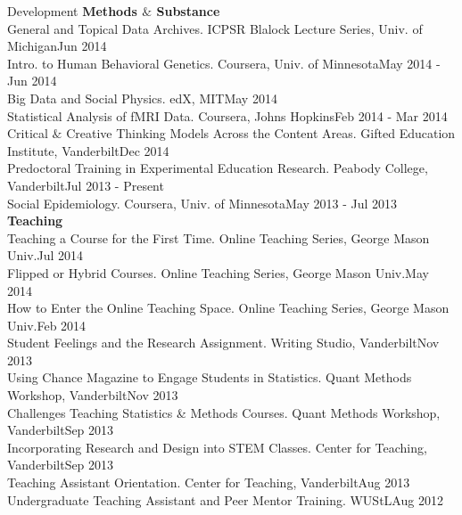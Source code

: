 \documentclass {resume}
\begin{document}
\pagebreak

\begin{rSection}{\textrm{Development}}
{\large \textbf{Methods $\&$ Substance}}\\
General and Topical Data Archives. ICPSR Blalock Lecture Series, Univ. of Michigan\hfill  {Jun 2014}\smallskip\\
Intro. to Human Behavioral Genetics. Coursera, Univ. of Minnesota\hfill  {May 2014 - Jun 2014}\smallskip\\
Big Data and Social Physics. edX, MIT\hfill  {May 2014}\smallskip\\
Statistical Analysis of fMRI Data. Coursera, Johns Hopkins\hfill  {Feb 2014 - Mar 2014}\smallskip\\
Critical $\&$ Creative Thinking Models Across the Content Areas. Gifted Education Institute, Vanderbilt\hfill {Dec 2014}\smallskip\\
Predoctoral Training in Experimental Education Research. Peabody College, Vanderbilt\hfill  {Jul 2013 - Present}\smallskip\\
Social Epidemiology. Coursera, Univ. of Minnesota\hfill  {May 2013 - Jul 2013}%
\medskip\\
{\large {\bf Teaching}}\\
Teaching a Course for the First Time. Online Teaching Series, George Mason Univ.\hfill  {Jul 2014}\smallskip\\
Flipped or Hybrid Courses. Online Teaching Series, George Mason Univ.\hfill  {May 2014}\smallskip\\
How to Enter the Online Teaching Space. Online Teaching Series, George Mason Univ.\hfill  {Feb 2014}\smallskip\\
Student Feelings and the Research Assignment. Writing Studio, Vanderbilt\hfill  {Nov 2013}\smallskip\\
Using Chance Magazine to Engage Students in Statistics. Quant Methods Workshop, Vanderbilt\hfill  {Nov 2013}\smallskip\\
Challenges Teaching Statistics \& Methods Courses. Quant Methods Workshop, Vanderbilt\hfill  {Sep 2013}\smallskip\\
Incorporating Research and Design into STEM Classes. Center for Teaching, Vanderbilt\hfill  {Sep 2013}\smallskip\\
Teaching Assistant Orientation. Center for Teaching, Vanderbilt\hfill  {Aug 2013}\smallskip\\
Undergraduate Teaching Assistant and Peer Mentor Training. WUStL\hfill  {Aug 2012}
\end{rSection}
\end{document}
